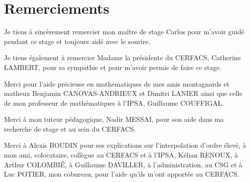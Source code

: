 \chapter*{Remerciements}

Je tiens à sincèrement remercier mon maître de stage Carlos pour m'avoir guidé pendant ce stage et toujours aidé avec le sourire.

Je tiens également à remercier Madame la présidente du CERFACS, Catherine LAMBERT, pour sa sympathie et pour m'avoir permis de faire ce stage.

Merci pour l'aide précieuse en mathématiques de mes amis montagnards et matheux Benjamin CANOVAS-ANDRIEUX et Dimitri LANIER ainsi que celle de mon professeur de mathématiques à l'IPSA, Guillaume COUFFIGAL.

Merci à mon tuteur pédagogique, Nadir MESSAI, pour son aide dans ma recherche de stage et au sein du CERFACS.

Merci à Alexis BOUDIN pour ses explications sur l'interpolation d'ordre élevé, à mon ami, colocataire, collègue au CERFACS et à l'IPSA, Kélian RENOUX, à Arthur COLOMBIÉ, à Guillaume DAVILLER, à l'administration, au CSG et à Luc POTIER, mon cobureau, pour l'aide qu'ils m'ont apportée au CERFACS.
